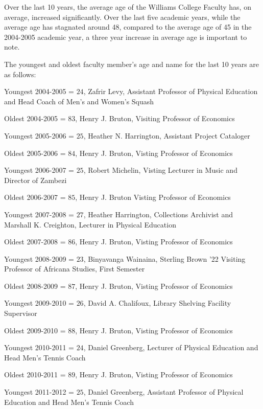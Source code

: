 \documentclass[12pt,a4paper]{article}\usepackage[]{graphicx}\usepackage[]{color}
\theoremstyle{definition}
\begin{document}
\bigskip
Over the last 10 years, the average age of the Williams College Faculty has, on average, increased significantly. Over the last five academic years, while the average age has stagnated around 48, compared to the average age of 45 in the 2004-2005 academic year, a three year increase in average age is important to note.


\bigskip
The youngest and oldest faculty member's age and name for the last 10 years are as follows:

\bigskip
Youngest 2004-2005 = \(24\), Zafrir Levy, Assistant Professor of Physical Education and Head Coach of Men's and Women's Squash

\bigskip
Oldest 2004-2005 = \(83\), Henry J. Bruton, Visiting Professor of Economics

\bigskip
Youngest 2005-2006 = \(25\), Heather N. Harrington, Assistant Project Cataloger

\bigskip
Oldest 2005-2006 = \(84\), Henry J. Bruton, Visting Professor of Economics

\bigskip
Youngest 2006-2007 = \(25\), Robert Michelin, Visting Lecturer in Music and Director of Zambezi

\bigskip
Oldest 2006-2007 = \(85\), Henry J. Bruton Visting Professor of Economics

\bigskip
Youngest 2007-2008 = \(27\), Heather Harrington, Collections Archivist and Marshall K. Creighton, Lecturer in Physical Education

\bigskip
Oldest 2007-2008 = \(86\), Henry J. Bruton, Visting Professor of Economics

\bigskip
Youngest 2008-2009 = \(23\), Binyavanga Wainaina, Sterling Brown '22 Visiting Professor of Africana Studies, First Semester

\bigskip
Oldest 2008-2009 = \(87\), Henry J. Bruton, Visting Professor of Economics

\bigskip
Youngest 2009-2010 = \(26\), David A. Chalifoux, Library Shelving Facility Supervisor

\bigskip
Oldest 2009-2010 = \(88\), Henry J. Bruton, Visting Professor of Economics

\bigskip
Youngest 2010-2011 = \(24\), Daniel Greenberg, Lecturer of Physical Education and Head Men's Tennis Coach

\bigskip
Oldest 2010-2011 = \(89\), Henry J. Bruton, Visting Professor of Economics

\bigskip
Youngest 2011-2012 = \(25\), Daniel Greenberg, Assistant Professor of Physical Education and Head Men's Tennis Coach
\end{document}
